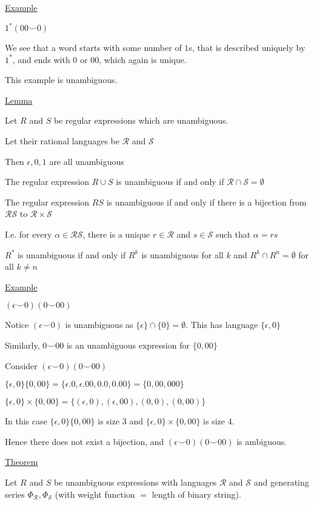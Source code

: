 \documentclass{article}
\newcommand\mc{\mathcal}
\begin{document}
\underline{Example}

$1^*(00\smile0)$

We see that a word starts with some number of $1$s, that is described uniquely by $1^*$, and ends with $0$ or $00$, which again is unique. 

This example is unambiguous. 

\underline{Lemma}

Let $R$ and $S$ be regular expressions which are unambiguous. 

Let their rational languages be $\mc{R}$ and $\mc{S}$

Then $\epsilon, 0, 1$ are all unambiguous

The regular expression $R \cup S$ is unambiguous if and only if $\mc{R} \cap \mc{S} = \emptyset$

The regular expression $RS$ is unambiguous if and only if there is a bijection from $\mc{RS}$ to $\mc{R} \times \mc{S}$

I.e. for every $\alpha \in \mc{RS}$, there is a unique $r \in \mc{R}$ and $s \in \mc{S}$ such that $\alpha = rs$

$R^*$ is unambiguous if and only if $R^k$ is unambiguous for all $k$ and $R^k \cap R^n = \emptyset$ for all $k \ne n$

\underline{Example}

$(\epsilon \smile 0)(0 \smile 00)$

Notice $(\epsilon \smile 0)$ is unambiguous as $\{\epsilon\} \cap \{0\} = \emptyset$. This has language $\{\epsilon, 0\}$

Similarly, $0\smile00$ is an unambiguous expression for $\{0,00\}$

Consider $(\epsilon \smile 0)(0 \smile 00)$

$\{\epsilon, 0\}\{0,00\} = \{\epsilon.0, \epsilon.00, 0.0,0.00\} = \{0,00,000\}$


$\{\epsilon, 0\} \times \{0,00\} = \{(\epsilon,0),(\epsilon,00),(0,0),(0,00)\}$

In this case $\{\epsilon,0\}\{0,00\}$ is size $3$ and $\{\epsilon,0\} \times \{0,00\}$ is size $4$.

Hence there does not exist a bijection, and $(\epsilon \smile 0)(0 \smile 00)$ is ambiguous.

\underline{Theorem}

Let $R$ and $S$ be unambiguous expressions with languages $\mc{R}$ and $\mc{S}$ and generating series $\Phi_{\mc{R}}, \Phi_{\mc{S}}$ (with weight function $=$ length of binary string).
\end{document}
